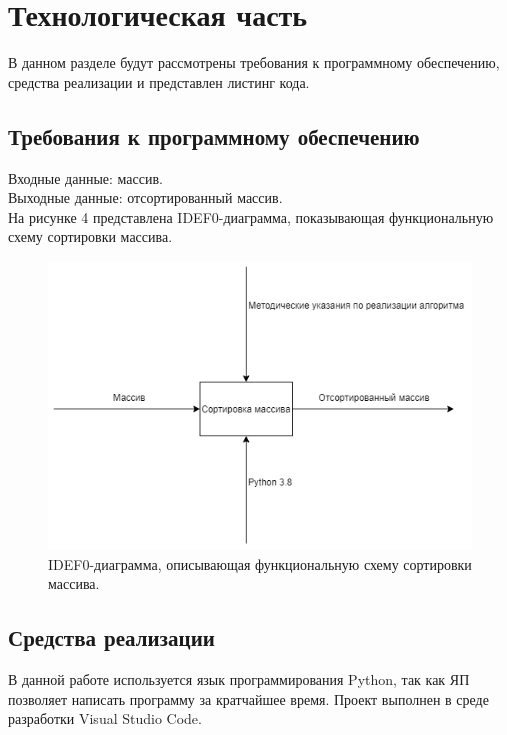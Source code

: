 \documentclass[a4paper, 12pt]{article}
\begin{document}
\section{Технологическая часть}
\begin{flushleft}
	\hspace*{5mm} В данном разделе будут рассмотрены требования к программному обеспечению, средства реализации и представлен листинг кода.
	\subsection{Требования к программному обеспечению}
	\hspace*{5mm} Входные данные: массив.
	\\ \hspace*{5mm} Выходные данные: отсортированный массив.
	\\ \hspace*{5mm} На рисунке 4 представлена IDEF0-диаграмма, показывающая функциональную схему сортировки массива.
	\begin{figure}[h]
		
		\centering \includegraphics[scale=0.8]{диаграмма}
		\centering\caption{IDEF0-диаграмма, описывающая функциональную схему сортировки массива.}
	\end{figure}
	\subsection{Средства реализации}
	\hspace*{5mm} В данной работе используется язык программирования Python, так как ЯП позволяет написать программу за кратчайшее время. Проект выполнен в среде разработки Visual Studio Code.
	\clearpage
	\newpage

\end{flushleft}
\end{document}
